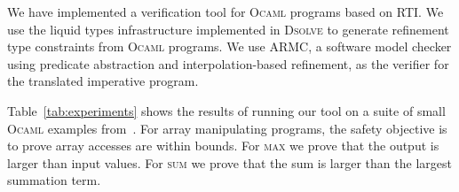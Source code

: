 \documentclass[nocopyrightspace]{sigplanconf}
\newcommand\HMC{\textsc{RTI}\xspace}
\newcommand\ocaml{\textsc{Ocaml}\xspace}
\newcommand\dsolve{\textsc{Dsolve}\xspace}
\newcommand\ARMC{\textsc{ARMC}\xspace}
\newcommand{\kvar}{\kappa}
\def\rkvar{{\kvar}}
\begin{document}
We have implemented a verification tool for \ocaml programs based on \HMC.
We use the liquid types infrastructure implemented in \dsolve \cite{LiquidPLDI08}
to generate refinement type constraints from \ocaml programs.
We use \ARMC \cite{PADL07},
a software model checker using predicate abstraction and interpolation-based
refinement, as the verifier for the translated imperative program.

\iffalse
Our implementation exploits the following structure of the reachability set of the translated
programs.
Since the variables $\rkvar$ corresponding to refinement predicates
are independent, the vector of predicates defining an abstract state can be partitioned
such that each partition only refers to one relation variable.
This {\em Cartesian} abstraction leads to convergence in time linear in the height 
of the abstract domain and linear in the number of relation variables. 
For refinement, base variables can be limited in scope to each block,
and the only information that flows between the blocks refers to
relation variables.
\fi

Table~\ref{tab:experiments} shows the results of running our tool on a
suite of small \ocaml examples from~\cite{LiquidPLDI08}.
For array manipulating programs, the safety objective is to prove
array accesses are within bounds.
For \textsc{max} we prove that the output is larger than input values.
For \textsc{sum} we prove that the sum is larger than the largest
summation term.
\end{document}
